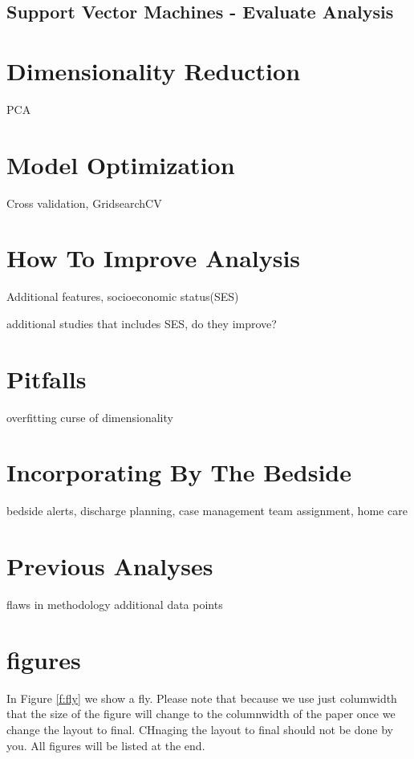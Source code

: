 \documentclass[sigconf]{acmart}
\begin{document}
\subsection{Support Vector Machines - Evaluate Analysis}



\section{Dimensionality Reduction}

PCA

\section{Model Optimization}

Cross validation, GridsearchCV

\section{How To Improve Analysis}

Additional features, socioeconomic status(SES)

additional studies that includes SES, do they improve?

\section{Pitfalls}

overfitting
curse of dimensionality

\section{Incorporating By The Bedside}
bedside alerts, discharge planning, case management team assignment, home care

\section{Previous Analyses}

flaws in methodology
additional data points

\section{figures}

In Figure \ref{f:fly} we show a fly. Please note that because we use
just columwidth that the size of the figure will change to the
columnwidth of the paper once we change the layout to final. CHnaging
the layout to final should not be done by you. All figures will be
listed at the end.
\end{document}
